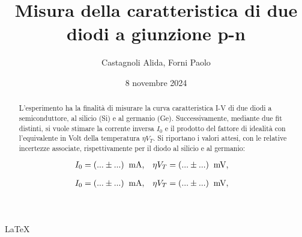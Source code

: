\documentclass[11pt]{article}
\begin{document}
\LaTeX

\title{\textbf{Misura della caratteristica di due diodi a giunzione p-n}}
\author{Castagnoli Alida, Forni Paolo}
\date{8 novembre 2024}
\maketitle

\begin{abstract}
    L'esperimento ha la finalità di misurare la curva caratteristica I-V di due diodi a semiconduttore, al silicio (Si) e al germanio (Ge). 
    Successivamente, mediante due fit distinti, si vuole stimare la corrente inversa $I_{0}$ e il prodotto del fattore di idealità con l'equivalente in Volt della temperatura $\eta V_{T}$.  
    Si riportano i valori attesi, con le relative incertezze associate, rispettivamente per il diodo al silicio e al germanio:

    \begin{align*}
        I_{0} &= (... \pm ...) \;\;\textnormal{mA}, & 
        \eta V_{T} &= (... \pm ...)\;\;\textnormal{mV}, &
    \end{align*}

    \vspace{-0.6cm}

    \begin{align*}
        I_{0} &= (... \pm ...) \;\;\textnormal{mA}, & 
        \eta V_{T} &= (... \pm ...)\;\;\textnormal{mV}, &
    \end{align*}

\end{abstract}


\end{document}
